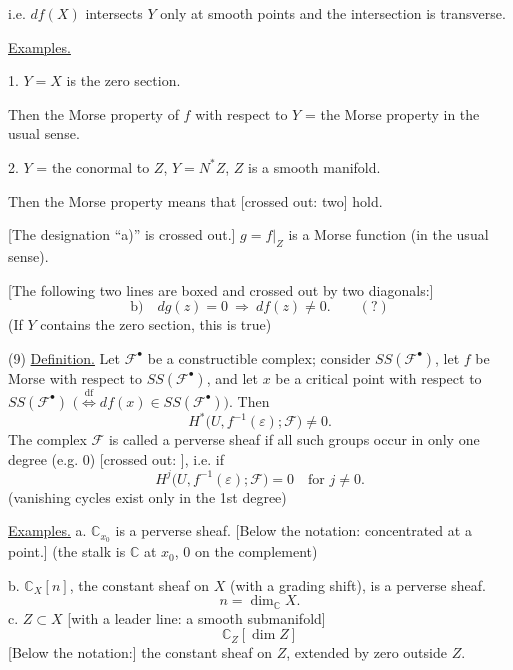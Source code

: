 i.e. $df(X)$ intersects $Y$ only at smooth points and the intersection is transverse.

\underline{Examples.}

1. $Y=X$ is the zero section.

Then the Morse property of $f$ with respect to $Y$ = the Morse property in the usual sense.

2. $Y$ = the conormal to $Z$, $Y=N^{*}Z$, $Z$ is a smooth manifold.

Then the Morse property means that [crossed out: two]
 hold.

[The designation “a)” is crossed out.]
$g=f|_Z$ is a Morse function (in the usual sense).

[The following two lines are boxed and crossed out by two diagonals:]
\begin{equation*}
\text{b)}\quad dg(z)=0\ \Rightarrow\ df(z)\ne0.\qquad (?)
\end{equation*}
(If $Y$ contains the zero section, this is true)

(9) \underline{Definition.}
Let $\mathcal{F}^{\bullet}$ be a constructible complex; consider
$SS(\mathcal{F}^{\bullet})$, let $f$ be Morse with respect to
$SS(\mathcal{F}^{\bullet})$, and let $x$ be a critical point with respect to
$SS(\mathcal{F}^{\bullet})$
$\bigl(\overset{\mathrm{df}}{\Longleftrightarrow}
df(x)\in SS(\mathcal{F}^{\bullet})\bigr)$.
Then
\begin{equation*}
H^{*}\bigl(U,f^{-1}(\varepsilon);\mathcal{F}\bigr)\ne0.
\end{equation*}
The complex $\mathcal{F}$ is called a perverse sheaf
if all such groups occur in only one degree
(e.g. 0) [crossed out: ], i.e. if
\begin{equation*}
H^{j}\bigl(U,f^{-1}(\varepsilon);\mathcal{F}\bigr)=0
\quad\text{for }j\ne0. \tag{10}
\end{equation*}
(vanishing cycles exist only in the 1st degree)

\underline{Examples.}
a. $\mathbb{C}_{x_0}$ is a perverse sheaf.
[Below the notation: concentrated at a point.]
(the stalk is $\mathbb{C}$ at $x_0$, $0$ on the complement)

b. $\mathbb{C}_X[n]$, the constant sheaf on $X$
(with a grading shift), is a perverse sheaf.
\begin{equation*}
n=\dim_{\mathbb{C}}X.
\end{equation*}
c. $Z\subset X$ [with a leader line: a smooth submanifold]
\begin{equation*}
\mathbb{C}_Z[\dim Z]
\end{equation*}
[Below the notation:]
the constant sheaf on $Z$, extended by zero outside $Z$.

